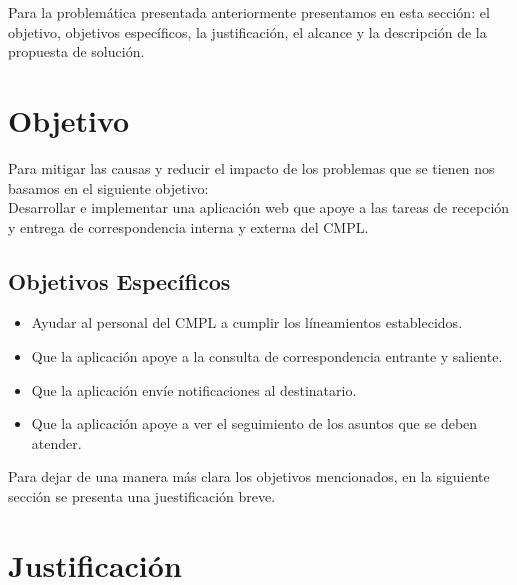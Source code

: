 Para la problemática presentada anteriormente presentamos en esta sección: el objetivo, objetivos específicos, la justificación, el alcance y la descripción de la propuesta de solución.\\

\section{Objetivo}

Para mitigar las causas y reducir el impacto de los problemas que se tienen nos basamos en el siguiente objetivo: \\

Desarrollar e implementar una aplicación web que apoye a las tareas de recepción y entrega de correspondencia interna y externa del CMPL. \\

\subsection{Objetivos Específicos}

\begin{itemize}
	\item Ayudar al personal del CMPL a cumplir los líneamientos establecidos. %
	\item Que la aplicación apoye a la consulta de correspondencia entrante y saliente.
	\item Que la aplicación envíe notificaciones al destinatario.
	\item Que la aplicación apoye a ver el seguimiento de los asuntos que se deben atender.
\end{itemize}

Para dejar de una manera más clara los objetivos mencionados, en la siguiente sección se presenta una juestificación breve.

\section{Justificación}

